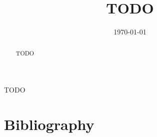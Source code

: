 \documentclass[11pt, oneside]{amsart}
\title{TODO}
\date{\today}
\begin{document}
\begin{abstract}
	TODO 
\end{abstract}
\maketitle
TODO

\section[bib]{Bibliography}
\end{document}
